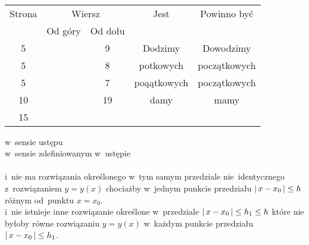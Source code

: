 \documentclass[a4paper,11pt]{article}
\begin{document}
\vspace{\spaceFour}





\noindent
{} \Dok \\

\vspace{\spaceFour}





\noindent
{} \Dok






\begin{center}

  \begin{tabular}{|c|c|c|c|c|}
    \hline
    Strona & \multicolumn{2}{c|}{Wiersz} & Jest
                              & Powinno być \\ \cline{2-3}
    & Od góry & Od dołu & & \\
    \hline
    5   & &  9 & Dodzimy & Dowodzimy \\
    5   & &  8 & potkowych & początkowych \\
    5   & &  7 & poąątkowych & początkowych \\
    10  & & 19 & damy & mamy \\
    15  & & & & \\
    \hline
  \end{tabular}

\end{center}

\vspace{\spaceTwo}


\noindent
{}
\Jest  w~sensie ustępu \\
\Powin w~sensie zdefiniowanym w~ustępie \\
 \\
\Jest  i~nie ma rozwiązania określonego w~tym samym przedziale
nie~identycznego z~rozwiązaniem $y = y( x )$ chociażby w~jednym
punkcie przedziału $|\, {  x - x_{ 0 }  } \,| \leq h$ różnym
od~punktu $x = x_{ 0 }$. \\
\Powin i~nie istnieje inne rozwiązanie określone w~przedziale
$|\, {  x - x_{ 0 }  } \,| \leq h_{ 1 } \leq h$ które nie byłoby równe
rozwiązaniu $y = y( x )$ w~każdym punkcie przedziału
$|\, {  x - x_{ 0 }  } \,| \leq h_{ 1 }$. \\
\end{document}

